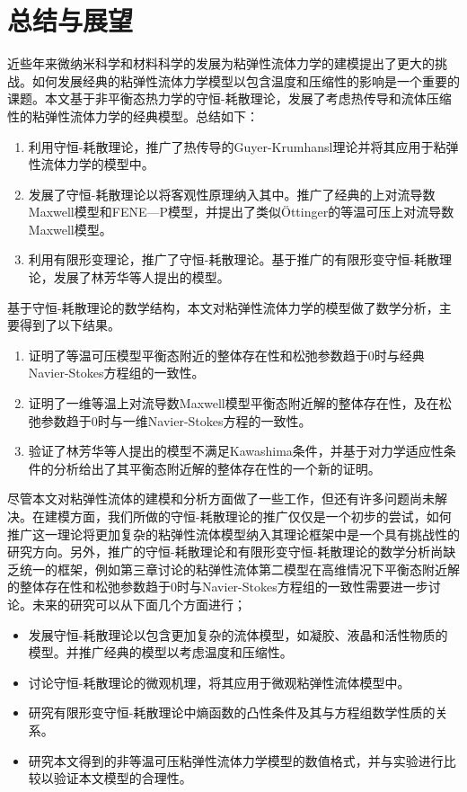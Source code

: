 \chapter{总结与展望}

% 
近些年来微纳米科学和材料科学的发展为粘弹性流体力学的建模提出了更大的挑战。如何发展经典的粘弹性流体力学模型以包含温度和压缩性的影响是一个重要的课题。本文基于非平衡态热力学的守恒-耗散理论，发展了考虑热传导和流体压缩性的粘弹性流体力学的经典模型。总结如下：
\begin{enumerate}
	\item 利用守恒-耗散理论，推广了热传导的Guyer-Krumhansl理论并将其应用于粘弹性流体力学的模型中。
	\item 发展了守恒-耗散理论以将客观性原理纳入其中。推广了经典的上对流导数Maxwell模型和FENE—P模型，并提出了类似\"Ottinger的等温可压上对流导数Maxwell模型。
	\item 利用有限形变理论，推广了守恒-耗散理论。基于推广的有限形变守恒-耗散理论，发展了林芳华等人提出的模型。
\end{enumerate}
基于守恒-耗散理论的数学结构，本文对粘弹性流体力学的模型做了数学分析，主要得到了以下结果。
\begin{enumerate}
	\item 证明了等温可压模型平衡态附近的整体存在性和松弛参数趋于$0$时与经典Navier-Stokes方程组的一致性。
	\item 证明了一维等温上对流导数Maxwell模型平衡态附近解的整体存在性，及在松弛参数趋于$0$时与一维Navier-Stokes方程的一致性。
	\item 验证了林芳华等人提出的模型不满足Kawashima条件，并基于对力学适应性条件的分析给出了其平衡态附近解的整体存在性的一个新的证明。
\end{enumerate}

尽管本文对粘弹性流体的建模和分析方面做了一些工作，但还有许多问题尚未解决。在建模方面，我们所做的守恒-耗散理论的推广仅仅是一个初步的尝试，如何推广这一理论将更加复杂的粘弹性流体模型纳入其理论框架中是一个具有挑战性的研究方向。另外，推广的守恒-耗散理论和有限形变守恒-耗散理论的数学分析尚缺乏统一的框架，例如第三章讨论的粘弹性流体第二模型在高维情况下平衡态附近解的整体存在性和松弛参数趋于$0$时与Navier-Stokes方程组的一致性需要进一步讨论。未来的研究可以从下面几个方面进行；
\begin{itemize}
	\item 发展守恒-耗散理论以包含更加复杂的流体模型，如凝胶、液晶和活性物质的模型。并推广经典的模型以考虑温度和压缩性。
	\item 讨论守恒-耗散理论的微观机理，将其应用于微观粘弹性流体模型中。
	\item 研究有限形变守恒-耗散理论中熵函数的凸性条件及其与方程组数学性质的关系。
	\item 研究本文得到的非等温可压粘弹性流体力学模型的数值格式，并与实验进行比较以验证本文模型的合理性。
\end{itemize}

% 